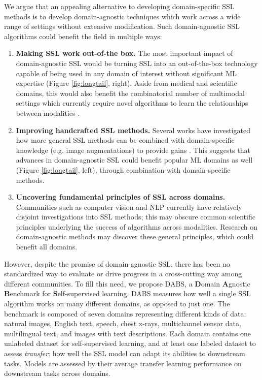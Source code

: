 \documentclass{article}
\begin{document}
We argue that an appealing alternative to developing domain-specific SSL methods is to develop domain-agnostic techniques which work across a wide range of settings without extensive modification. Such domain-agnostic SSL algorithms could benefit the field in multiple ways:

\begin{enumerate}
    \item \textbf{Making SSL work out-of-the box.} The most important impact of domain-agnostic SSL would be turning SSL into an out-of-the-box technology capable of being used in any domain of interest without significant ML expertise  (Figure \ref{fig:longtail}, right). Aside from medical and scientific domains, this would also benefit the combinatorial number of multimodal settings which currently require novel algorithms to learn the relationships between modalities \citep{Lu2019ViLBERTPT, Chen2020UNITERUI, Tan2019LXMERTLC}. 
    \item \textbf{Improving handcrafted SSL methods.} Several works have investigated how more general SSL methods can be combined with domain-specific knowledge (e.g. image augmentations) to provide gains  \citep{Lee2021iMIXAD, Tamkin2020ViewmakerNL, Verma2020TowardsDC}. This suggests that advances in domain-agnostic SSL could benefit popular ML domains as well  (Figure \ref{fig:longtail}, left), through combination with domain-specific methods.
    \item \textbf{Uncovering fundamental principles of SSL across domains.} Communities such as computer vision and NLP currently have relatively disjoint investigations into SSL methods; this may obscure common scientific principles underlying the success of algorithms across modalities. Research on domain-agnostic methods may discover these general principles, which could benefit all domains.
\end{enumerate} 


However, despite the promise of domain-agnostic SSL, there has been no standardized way to evaluate or drive progress in a cross-cutting way among different communities. To fill this need, we propose DABS, a \textbf{D}omain \textbf{A}gnostic \textbf{B}enchmark for \textbf{S}elf-supervised learning. DABS measures how well a single SSL algorithm works on many different domains, as opposed to just one. The benchmark is composed of seven domains representing different kinds of data:  natural images, English text, speech, chest x-rays, multichannel sensor data, multilingual text, and images with text descriptions. Each domain contains one unlabeled dataset for self-supervised learning, and at least one labeled dataset to assess \emph{transfer}: how well the SSL model can adapt its abilities to downstream tasks. Models are assessed by their average transfer learning performance on downstream tasks across domains. 
\end{document}
